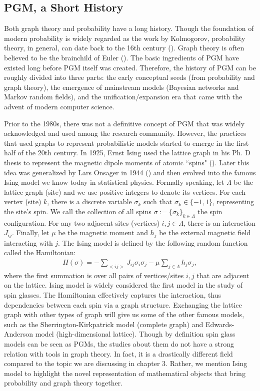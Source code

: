 \subsection{PGM, a Short History} \label{intro_chap:sec:MRF:sec:PGM_history}
Both graph theory and probability have a long history. Though the foundation of
modern probability is widely regarded as the work by Kolmogorov, probability
theory, in general, can date back to the 16th century
(\cite{lightner1991brief}). Graph theory is often believed to be the brainchild of Euler (\cite{Euler1736}). The basic ingredients of PGM have existed
long before PGM itself was created. Therefore, the history of PGM can be
roughly divided into three parts: the early conceptual seeds (from probability
and graph theory), the emergence of mainstream models (Bayesian networks and
Markov random fields), and the unification/expansion era that came with the
advent of modern computer science.

Prior to the 1980s, there was not a definitive concept of PGM that was widely
acknowledged and used among the research community. However, the practices that
used graphs to represent probabilistic models started to emerge in the first
half of the 20th century. In 1925, Ernst Ising used the lattice graph in his
Ph. D thesis to represent the magnetic dipole moments of atomic ``spins"
(\cite{Ising1925BeitragZT}). Later this idea was generalized by Lars Onsager in
1944 (\cite{PhysRev.65.117}) and then evolved into the famous Ising model we
know today in statistical physics. Formally speaking, let $\Lambda$ be the
lattice graph (site) and we use positive integers to denote its vertices. For
each vertex (site) $k$, there is a discrete variable $\sigma_k$ such that
$\sigma_k \in \{-1,1\}$, representing the site's spin. We call the collection
of all spins $\sigma := \{\sigma_k\}_{k \in \Lambda}$ the spin configuration.
For any two adjacent sites (vertices) $i,j \in \Lambda$, there is an interaction
$J_{ij}$. Finally, let $\mu$ be the magnetic moment and $h_j$ be the external
magnetic field interacting with $j$. The Ising model is defined by the
following random function called the Hamiltonian:
\begin{align}
    H(\sigma) = -\sum_{<ij>} J_{ij} \sigma_i \sigma_j - \mu \sum_{j \in \Lambda} h_j \sigma_j,
\end{align}
where the first summation is over all pairs of vertices/sites $i,j$ that are adjacent on the lattice. Ising model is widely considered the first model in the study of spin glasses. The Hamiltonian effectively captures the interaction, thus dependencies between each spin via a graph structure. Exchanging the lattice graph with other types of graph will give us some of the other famous models, such as the Sherrington-Kirkpatrick model (complete graph) and Edwards-Anderson model (high-dimensional lattice). Though by definition spin glass models can be seen as PGMs, the studies about them do not have a strong relation with tools in graph theory. In fact, it is a drastically different field compared to the topic we are discussing in chapter 3. Rather, we mention Ising model to highlight the novel representation of mathematical objects that bring probability and graph theory together.


